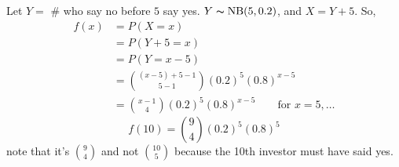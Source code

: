 Let $ Y= $ \# who say no before $ 5 $ say yes.
$ Y\thicksim\operatorname{NB}(5,0.2) $, and $ X=Y+5 $. So,
\begin{align*}
    f(x)&=P(X=x)\\
    &=P(Y+5=x)\\
    &=P(Y=x-5)\\
    &=\binom{(x-5)+5-1}{5-1}(0.2)^5(0.8)^{x-5}\\
    &=\binom{x-1}{4}(0.2)^5(0.8)^{x-5} \qquad \text{for } x=5,\ldots
\end{align*}
\[ f(10)=\binom{9}{4}(0.2)^5(0.8)^5 \]
note that it's $ \binom{9}{4} $ and not $ \binom{10}{5} $ because
the 10th investor must have said yes.